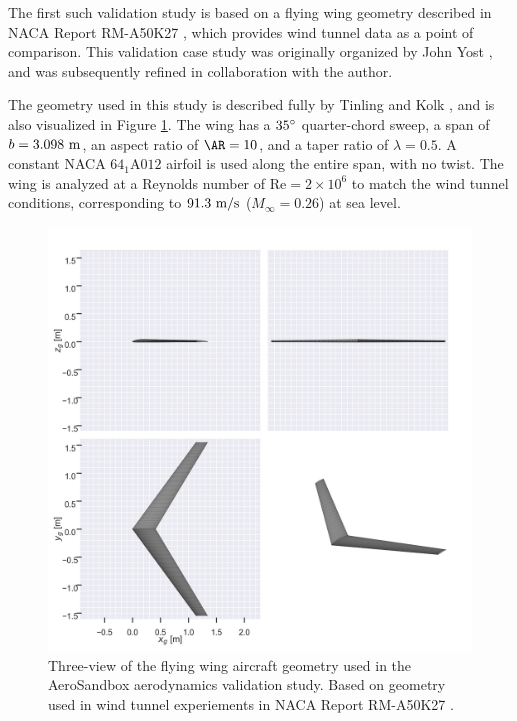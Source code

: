 The first such validation study is based on a flying wing geometry described in NACA Report RM-A50K27 \cite{tinling_effects_1951}, which provides wind tunnel data as a point of comparison. This validation case study was originally organized by John Yost \cite{yost2022}, and was subsequently refined in collaboration with the author.

The geometry used in this study is described fully by Tinling and Kolk \cite{tinling_effects_1951}, and is also visualized in Figure \ref{fig:fw_geometry}. The wing has a $35\degree$ quarter-chord sweep, a span of $b=3.098\ \rm m$, an aspect ratio of $\AR = 10$, and a taper ratio of $\lambda=0.5$. A constant NACA $\mathrm{64_{1}A012}$ airfoil is used along the entire span, with no twist. The wing is analyzed at a Reynolds number of $\text{Re}=2 \times 10^6$ to match the wind tunnel conditions, corresponding to $91.3\ \rm m/s$ ($M_\infty=0.26$) at sea level.

\begin{figure}[!htb]
    \centering
    \includegraphics[width=5in]{../figures/aero_validation/flying_wing_geometry.png}
    \caption{Three-view of the flying wing aircraft geometry used in the AeroSandbox aerodynamics validation study. Based on geometry used in wind tunnel experiements in NACA Report RM-A50K27 \cite{tinling_effects_1951}.}
    \label{fig:fw_geometry}
\end{figure}

